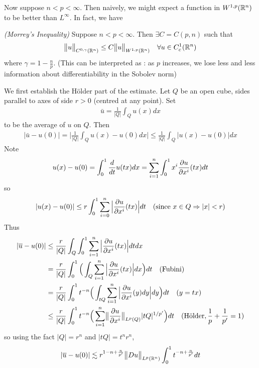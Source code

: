 \documentclass[12pt,a4paper]{report}
\newenvironment{proof}
{\begin{changemargin}{1cm}{0.5cm} 
	}%
	{\end{changemargin}
}
\begin{document}
Now suppose $n<p< \infty$. Then naively, we might expect a function in $W^{1,p}(\mathbb{R}^n)$ to be better than $L^{\infty}$. In fact, we have
\s

\thm \emph{(Morrey's Inequality)} Suppose $n<p<\infty$. Then $\exists C = C(p,n)$ such that
\begin{align*}
\bigl\lVert u\bigr\rVert_{C^{0,\gamma}(\mathbb{R}^n)} \leq C\bigl\lVert u\bigr\rVert_{W^{1,p}(\mathbb{R}^n)} \quad \forall u \in C_c^1(\mathbb{R}^n)
\end{align*}
where $\gamma = 1-\frac{n}{p}$. (This can be interpreted as : as $p$ increases, we lose less and less information about differentiability in the Sobolev norm)
\begin{proof}
\pf We first establish the H\"{o}lder part of the estimate. Let $Q$ be an open cube, sides parallel to axes of side $r>0$ (centred at any point). Set
\begin{align*}
\bar{u} = \frac{1}{|Q|} \int_{Q} u(x) dx
\end{align*}
to be the average of $u$ on $Q$. Then
\begin{align*}
|\bar{u}-u(0)| = \Big| \frac{1}{|Q|} \int_{Q} u(x) -u(0) dx \Big| \leq \frac{1}{|Q|} \int_{Q} |u(x)-u(0)| dx
\end{align*}
Note
\begin{align*}
u(x) - u(0) = \int_0^1 \frac{d}{dt} u(tx)dx = \sum_{i=1}^n \int_0^1 x^i \frac{\partial u}{\partial x^i} (tx) dt
\end{align*}
so
\begin{align*}
|u(x) - u(0)| \leq r \int_0^1 \sum_{i=0}^n \Big| \frac{\partial u}{\partial x^i} (tx)\Big| dt \quad \text{(since }x\in Q \Rightarrow |x|<r)
\end{align*}
Thus
\begin{align*}
|\overline{u}-u(0)| &\leq \frac{r}{|Q|} \int_Q \int_0^1 \sum_{i=1}^n \Big| \frac{\partial u}{\partial x^i}(tx)\Big| dtdx  \\
&=\frac{r}{|Q|} \int_0^1 \Big( \int_Q \sum_{i=1}^n \Big| \frac{\partial u}{\partial x^i} (tx) \Big| dx \Big) dt \quad (\text{Fubini}) \\
&= \frac{r}{|Q|} \int_0^1 t^{-n} \Big( \int_{tQ} \sum_{i=1}^n \Big| \frac{\partial u}{\partial x^i} (y) dy \Big| dy \Big) dt \quad (y=tx) \\
&\leq \frac{r}{|Q|} \int_0^1 t^{-n} \Big( \sum_{i=1}^n \bigl\lVert\frac{\partial u}{\partial x^i}\bigr\rVert_{L^p(Q)} |tQ|^{1/p'} \Big) dt \quad (\text{H\"{o}lder}, \frac{1}{p}+ \frac{1}{p'} = 1)
\end{align*}
so using the fact $|Q| = r^n$ and $|tQ| = t^n r^n$,
\begin{align*}
|\bar{u}-u(0)| &\lesssim r^{1-n+ \frac{n}{p'}} \norms{Du}{L^p(\reals^n)} \int_0^1 t^{-n + \frac{n}{p'}} dt \\

\end{align*}
\end{proof}
\end{document}
